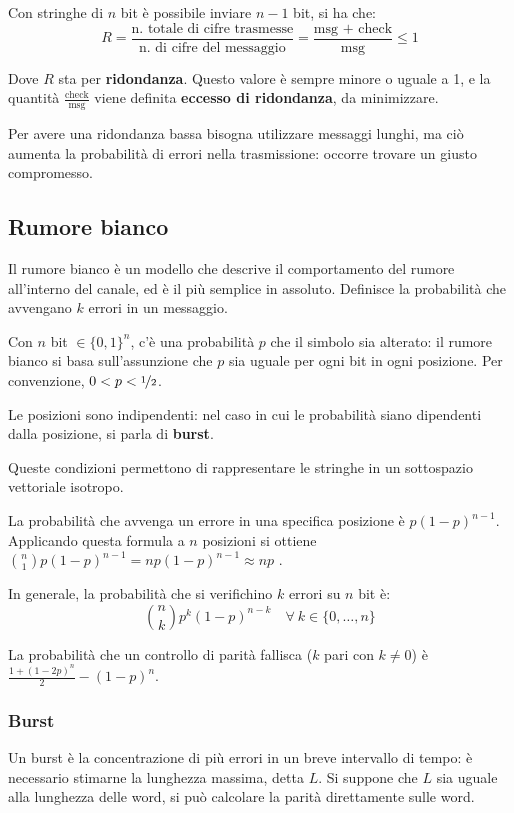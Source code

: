 Con stringhe di $n$ bit è possibile inviare $n - 1$ bit, si ha che:
$$R = \frac{\text{n. totale di cifre trasmesse}}{\text{n. di cifre del messaggio}} = \frac{\text{msg + check}}{\text{msg}} \leq 1$$

Dove $R$ sta per \textbf{ridondanza}. Questo valore è sempre minore o uguale a 1, e la quantità $\frac{\text{check}}{\text{msg}}$ viene definita \textbf{eccesso di ridondanza}, da minimizzare.

Per avere una ridondanza bassa bisogna utilizzare messaggi lunghi, ma ciò aumenta la probabilità di errori nella trasmissione: occorre trovare un giusto compromesso.

\subsection{Rumore bianco}
Il rumore bianco è un modello che descrive il comportamento del rumore all'interno del canale, ed è il più semplice in assoluto. Definisce la probabilità che avvengano $k$ errori in un messaggio.

Con $n$ bit $\in \{0, 1\}^n$, c'è una probabilità $p$ che il simbolo sia alterato: il rumore bianco si basa sull'assunzione che $p$ sia uguale per ogni bit in ogni posizione. Per convenzione, $0 < p < \nicefrac{1}{2}$. 

Le posizioni sono indipendenti: nel caso in cui le probabilità siano dipendenti dalla posizione, si parla di \textbf{burst}.

Queste condizioni permettono di rappresentare le stringhe in un sottospazio vettoriale isotropo. 

La probabilità che avvenga un errore in una specifica posizione è $p(1-p)^{n-1}$. Applicando questa formula a $n$ posizioni si ottiene $\binom{n}{1}p(1-p)^{n-1} = np(1-p)^{n-1} \approx np$ .

In generale, la probabilità che si verifichino $k$ errori su $n$ bit è:
$$\binom{n}{k}p^k(1-p)^{n-k} \quad \forall\ k \in \{0, \dots, n\}$$

La probabilità che un controllo di parità fallisca ($k$ pari con $k \neq 0$) è $\frac{1+(1-2p)^n}{2} - (1-p)^n$.

\subsubsection{Burst}
Un burst è la concentrazione di più errori in un breve intervallo di tempo: è necessario stimarne la lunghezza massima, detta $L$. Si suppone che $L$ sia uguale alla lunghezza delle word, si può calcolare la parità direttamente sulle word.

